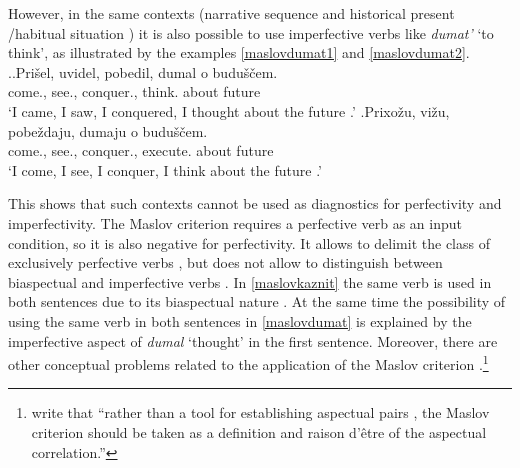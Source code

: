 However, in the same contexts   (narrative sequence  and historical present \slash habitual situation ) it is also possible to use imperfective verbs  like \textit{dumat'} `to think', as illustrated by the examples \ref{maslovdumat1} and \ref{maslovdumat2}.
\ex.\label{maslovdumat}\ag.\label{maslovdumat1}Pri\v{s}el\textsuperscript{\PF}, uvidel\textsuperscript{\PF}, pobedil\textsuperscript{\PF}, dumal\textsuperscript{\IPF} o budu\v{s}\v{c}em.\\
come., see., conquer., think. about future \\
\trans `I came, I saw, I conquered, I thought about the future .'
\bg.\label{maslovdumat2}Prixo\v{z}u\textsuperscript{\IPF}, vi\v{z}u\textsuperscript{\IPF}, pobe\v{z}daju\textsuperscript{\IPF}, dumaju\textsuperscript{\IPF} o budu\v{s}\v{c}em.\\
come., see., conquer., execute. about future \\
\trans `I come, I see, I conquer, I think about the future .'

This shows that such contexts   cannot be used as diagnostics for perfectivity and imperfectivity. The Maslov criterion  requires a perfective verb  as an input condition, so it is also negative for perfectivity. It allows to delimit the class of exclusively perfective verbs , but does not allow to distinguish between biaspectual and imperfective verbs . In \ref{maslovkaznit} the same verb is used in both sentences due to its biaspectual nature . At the same time the possibility of using the same verb in both sentences in \ref{maslovdumat} is explained by the imperfective aspect of \textit{dumal} `thought' in the first sentence. Moreover, there are other conceptual problems related to the application of the Maslov criterion .\footnote{\citet[2]{Mikaelian:07} write that ``rather than a tool for establishing aspectual pairs , the Maslov criterion  should be taken as a definition and raison d'\^etre of the aspectual correlation.''}


